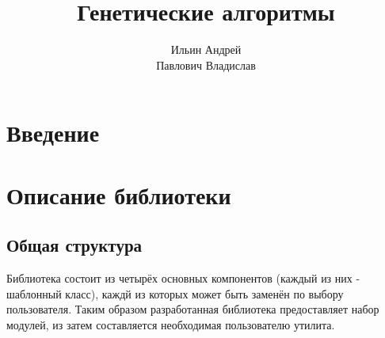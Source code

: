 \documentclass[11pt]{article}
\title{\textbf{Генетические алгоритмы}}
\author{Ильин Андрей\\Павлович Владислав}
\date{}
\begin{document}
\maketitle

\section{Введение}

\section{Описание библиотеки}
\subsection{Общая структура}

Библиотека состоит из четырёх основных компонентов (каждый из них - шаблонный класс), каждй из которых может быть заменён по выбору пользователя. Таким образом разработанная библиотека предоставляет набор модулей, из затем составляется необходимая пользователю утилита.

\end{document}
